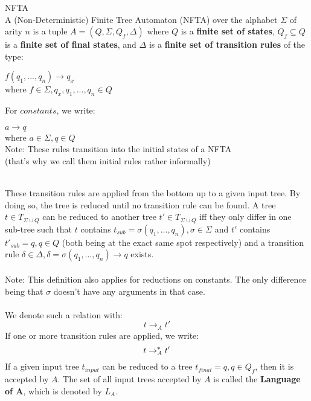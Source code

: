 \documentclass{llncs}
\begin{document}
\begin{definition}{NFTA \cite{tata-nfta}}
	\\
	A (Non-Deterministic) Finite Tree Automaton (NFTA) over the alphabet \(\Sigma\) of arity \(n\) is a tuple \(A = (Q, \Sigma, Q_f ,\Delta)\) where
	\(Q\) is a \textbf{finite set of states}, \(Q_f \subseteq Q\) is a  \textbf{finite set of final states}, and \(\Delta\) is a \textbf{finite set of transition rules} of the type:
	
	\begin{center}
		\(f(q_1,...,q_n) \rightarrow q_x\) \\
		where \(f \in \Sigma, q_x, q_1,...,q_n \in Q \)
	\end{center}
	For \(constants\), we write:
	\begin{center}
		\(a \rightarrow q\) \\
		where  \(a \in \Sigma, q \in Q \) \\
		Note: These rules transition into the initial states of a NFTA
		\\(that's why we call them initial rules rather informally)
	\end{center}
	~\\
	These transition rules are applied from the bottom up to a given input tree. By doing so, the tree is reduced until no transition rule can be found. A tree $t \in T_{\Sigma \cup Q}$ can be reduced to another tree $t' \in T_{\Sigma \cup Q}$ iff they only differ in one sub-tree such that \(t\) contains \(t_{sub}  = \sigma(q_1,..., q_n), \sigma \in \Sigma\) and \(t'\) contains \(t'_{sub} = q, q \in Q\) (both being at the exact same spot respectively) and a transition rule \(\delta \in \Delta, \delta = \sigma(q_1,..., q_n) \rightarrow q\) exists.
	\\
	\\
	Note: This definition also applies for reductions on constants. The only difference being that \(\sigma\) doesn't have any arguments in that case.
	\\\\
	We denote such a relation with:
		$$t \rightarrow_A t'$$
	If one or more transition rules are applied, we write:
		$$t \rightarrow_A^* t'$$
	If a given input tree \(t_{input}\) can be reduced to a tree \(t_{final} = q, q \in Q_f\), then it is accepted by \(A\). The set of all input trees accepted by \(A\) is called the \textbf{Language of A}, which is denoted by \(L_A\).
\end{definition}	

\pagebreak
\end{document}
